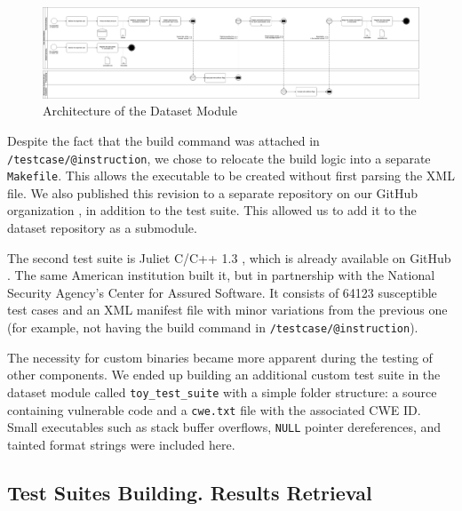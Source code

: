 \documentclass[../main.tex]{subfiles}
\begin{document}
\begin{landscape}
\vspace*{\fill}
\begin{figure}[!h]
   \centering
    \includegraphics[width=0.95\linewidth]{images/dataset.png}
    \caption{Architecture of the Dataset Module}
    \label{fig:dataset_architecture}
\end{figure}
\vspace*{\fill}
\end{landscape}

Despite the fact that the build command was attached in
\texttt{/testcase/@instruction}, we chose to relocate the build logic
into a separate \texttt{Makefile}. This allows the executable to be
created without first parsing the XML file. We also published this
revision to a separate repository on our GitHub organization \cite{nist_c_test_suite_repo}, in
addition to the test suite. This allowed us to add it to the dataset
repository as a submodule.

The second test suite is Juliet C/C++ 1.3 \cite{nist_juliet}, which is already available on
GitHub \cite{nist_juliet_repo}. The same American institution built it, but in partnership with
the National Security Agency's Center for Assured Software. It consists
of 64123 susceptible test cases and an XML manifest file with minor
variations from the previous one (for example, not having the build
command in \texttt{/testcase/@instruction}).

The necessity for custom binaries became more apparent during the
testing of other components. We ended up building an additional custom
test suite in the dataset module called \texttt{toy\_test\_suite} with a
simple folder structure: a source containing vulnerable code and a
\texttt{cwe.txt} file with the associated CWE ID. Small executables such
as stack buffer overflows, \texttt{NULL} pointer dereferences, and
tainted format strings were included here.

\hypertarget{test-suites-building.-results-retrieval}{%
\subsection{Test Suites Building. Results
Retrieval}\label{test-suites-building.-results-retrieval}}
\end{document}
